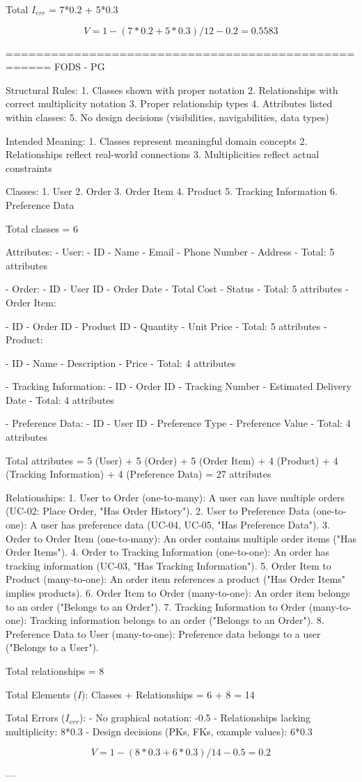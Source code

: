Total \( I_{err} \) =  7*0.2 + 5*0.3

\[
V = 1 - (7*0.2 + 5*0.3)/12 -0.2 = 0.5583
\]

====================================================
FODS - PG

Structural Rules:
1. Classes shown with proper notation
2. Relationships with correct multiplicity notation
3. Proper relationship types
4. Attributes listed within classes: 
5. No design decisions (visibilities, navigabilities, data types)

Intended Meaning:
1. Classes represent meaningful domain concepts
2. Relationships reflect real-world connections
3. Multiplicities reflect actual constraints

Classes:
1. User
2. Order
3. Order Item
4. Product
5. Tracking Information
6. Preference Data

Total classes = 6

Attributes:
- User:
- ID
- Name
- Email
- Phone Number
- Address
- Total: 5 attributes

- Order:
- ID
- User ID
- Order Date
- Total Cost
- Status
- Total: 5 attributes
- Order Item:

- ID
- Order ID
- Product ID
- Quantity
- Unit Price
- Total: 5 attributes
- Product:

- ID
- Name
- Description
- Price
- Total: 4 attributes

- Tracking Information:
- ID
- Order ID
- Tracking Number
- Estimated Delivery Date
- Total: 4 attributes

- Preference Data:
- ID
- User ID
- Preference Type
- Preference Value
- Total: 4 attributes

Total attributes = 5 (User) + 5 (Order) + 5 (Order Item) + 4 (Product) + 4 (Tracking Information) + 4 (Preference Data) = 27 attributes

Relationships:
1. User to Order (one-to-many): A user can have multiple orders (UC-02: Place Order, "Has Order History").
2. User to Preference Data (one-to-one): A user has preference data (UC-04, UC-05, "Has Preference Data").
3. Order to Order Item (one-to-many): An order contains multiple order items ("Has Order Items").
4. Order to Tracking Information (one-to-one): An order has tracking information (UC-03, "Has Tracking Information").
5. Order Item to Product (many-to-one): An order item references a product ("Has Order Items" implies products).
6. Order Item to Order (many-to-one): An order item belongs to an order ("Belongs to an Order").
7. Tracking Information to Order (many-to-one): Tracking information belongs to an order ("Belongs to an Order").
8. Preference Data to User (many-to-one): Preference data belongs to a user ("Belongs to a User").

Total relationships = 8

Total Elements (\( I \)):
Classes + Relationships = 6 + 8 = 14 

Total Errors (\( I_{err} \)):
- No graphical notation: -0.5
- Relationships lacking multiplicity: 8*0.3
- Design decisions (PKs, FKs, example values): 6*0.3

\[
V = 1 - (8*0.3+6*0.3)/14 - 0.5 = 0.2
\]

---